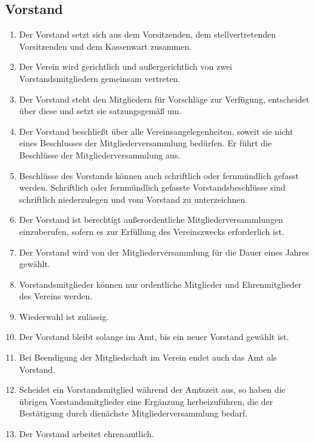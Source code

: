 \documentclass[12pt,a4paper,draft]{article}
\begin{document}
\subsection{Vorstand} %
\begin{enumerate}
\item Der Vorstand setzt sich aus dem Vorsitzenden, dem stellvertretenden 
Vorsitzenden und dem Kassenwart zusammen. %

\item Der Verein wird gerichtlich und außergerichtlich von zwei 
Vorstandsmitgliedern gemeinsam vertreten.

\item Der Vorstand steht den Mitgliedern für Vorschläge zur Verfügung, 
entscheidet über diese und setzt sie satzungsgemäß um.

\item Der Vorstand beschließt über alle Vereinsangelegenheiten, soweit sie 
nicht eines Beschlusses der Mitgliederversammlung bedürfen. Er führt die 
Beschlüsse der Mitgliederversammlung aus.

\item Beschlüsse des Vorstands können auch schriftlich oder fernmündlich 
gefasst werden. Schriftlich oder fernmündlich gefasste Vorstandsbeschlüsse 
sind schriftlich niederzulegen und vom Vorstand zu unterzeichnen.

\item Der Vorstand ist berechtigt außerordentliche Mitgliederversammlungen 
einzuberufen, sofern es zur Erfüllung des Vereinszwecks erforderlich ist.

\item Der Vorstand wird von der Mitgliederversammlung für die Dauer eines 
Jahres gewählt.

\item Vorstandsmitglieder können nur ordentliche Mitglieder und Ehrenmitglieder 
des Vereins werden.

\item Wiederwahl ist zulässig.

\item Der Vorstand bleibt solange im Amt, bis ein neuer Vorstand gewählt ist.

\item Bei Beendigung der Mitgliedschaft im Verein endet auch das Amt als 
Vorstand.

\item Scheidet ein Vorstandsmitglied während der Amtszeit aus, so haben die 
übrigen Vorstandsmitglieder eine Ergänzung herbeizuführen, die der Bestätigung 
durch dienächste Mitgliederversammlung bedarf.

\item Der Vorstand arbeitet ehrenamtlich. %
\end{enumerate}
\end{document}
